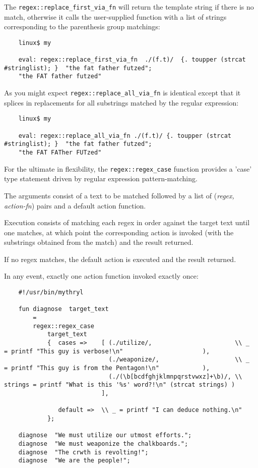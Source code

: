 The {\tt regex::replace\_first\_via\_fn} will return the template string if there is 
no match, otherwise it calls the user-supplied function with 
a list of strings corresponding to the parenthesis group matchings:

\begin{verbatim}
    linux$ my

    eval: regex::replace_first_via_fn  ./(f.t)/  {. toupper (strcat #stringlist); }  "the fat father futzed";
    "the FAT father futzed"
\end{verbatim}

As you might expect {\tt regex::replace\_all\_via\_fn} is identical except that it splices 
in replacements for all substrings matched by the regular expression:

\begin{verbatim}
    linux$ my

    eval: regex::replace_all_via_fn ./(f.t)/ {. toupper (strcat #stringlist); }  "the fat father futzed";
    "the FAT FATher FUTzed"
\end{verbatim}



For the ultimate in flexibility, the  
{\tt regex::regex\_case} function provides a 'case' 
type statement driven by regular expression 
pattern-matching.

The arguments consist of a text to be matched 
followed by a list of ({\it regex, action-fn}) pairs 
and a default action function.

Execution consists of matching each regex 
in order against the target text until one matches, 
at which point the corresponding action 
is invoked (with the substrings obtained 
from the match) and the result returned.

If no regex matches, the default action 
is executed and the result returned.

In any event, exactly one action function 
invoked exactly once:

\begin{verbatim}
    #!/usr/bin/mythryl

    fun diagnose  target_text
        =
        regex::regex_case
            target_text
            {  cases =>    [ (./utilize/,                       \\ _       = printf "This guy is verbose!\n"                      ),
                             (./weaponize/,                     \\ _       = printf "This guy is from the Pentagon!\n"            ),
                             (./(\b[bcdfghjklmnpqrstvwxz]+\b)/, \\ strings = printf "What is this '%s' word?!\n" (strcat strings) )
                           ],

               default =>  \\ _ = printf "I can deduce nothing.\n"
            };

    diagnose  "We must utilize our utmost efforts.";
    diagnose  "We must weaponize the chalkboards.";
    diagnose  "The crwth is revolting!";
    diagnose  "We are the people!";
\end{verbatim}

